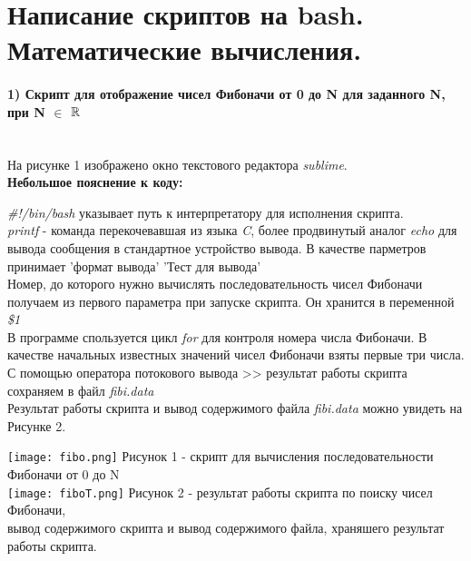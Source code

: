 \newpage
\section*{Написание скриптов на bash. Математические вычисления.}
	\paragraph*{1) Скрипт для отображение чисел Фибоначи от 0 до N для заданного N,
		 при N $\in$ $\mathbb{R}$\\ \\}

		На рисунке 1 изображено окно текстового редактора \textit{sublime}.\\

		\textbf{Небольшое пояснение к коду:\\}

		\textit{\#!/bin/bash} указывает путь к интерпретатору для исполнения скрипта.\\
		
		\textit{printf} - команда перекочевавшая из языка \textit{C}, более продвинутый аналог \textit{echo} для вывода сообщения в стандартное устройство вывода.
		В качестве парметров принимает 'формат вывода' 'Тест для вывода'\\

		Номер, до которого нужно вычислять последовательность чисел Фибоначи получаем из первого параметра при запуске скрипта. Он хранится в переменной \textit{\$1}\\

		В программе спользуется цикл \textit{for} для контроля номера числа Фибоначи. В качестве начальных известных значений чисел Фибоначи взяты первые три числа.\\

		С помощью оператора потокового вывода >> результат работы скрипта сохраняем в файл \textit{fibi.data}\\
		Результат работы скрипта и вывод содержимого файла \textit{fibi.data} можно увидеть на Рисунке 2.\\

		\vspace{0.5cm}
		\begin{center}
			\texttt{[image: fibo.png]}
			Рисунок 1 - скрипт для вычисления последовательности Фибоначи от 0 до N\\

			\texttt{[image: fiboT.png]}
			Рисунок 2 - результат работы скрипта по поиску чисел Фибоначи, \\ 
			вывод содержимого скрипта и вывод содержимого файла, храняшего результат работы скрипта.\\
		\end{center}

